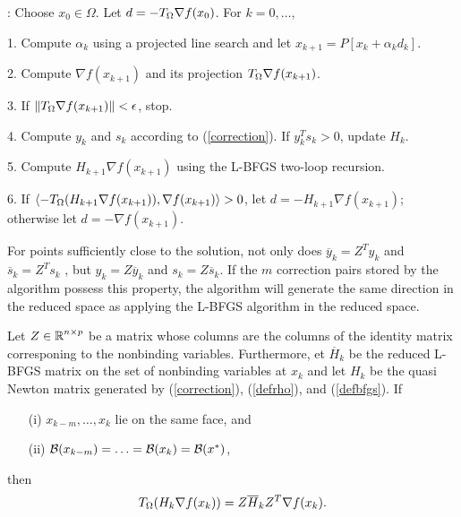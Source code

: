 \begin{Algorithm}
: 
Choose $ x_0 \in \Omega $. Let $d = - T_{\Omega} \nabla f(x_0)$.   
For $ k = 0, \ldots, $
\begin{list}{}
{
\setlength{\parsep}{0pt}
\setlength{\itemsep}{0pt}
\setlength{\topsep}{0pt}
}
\item[1.]
Compute $\alpha_k$ using a projected line search and let
$x_{k+1} = P [x_k + \alpha_k {d_k}]$.

\item[2.]
Compute $\nabla f(x_{k+1})$ and  its projection $T_{\Omega} \nabla f(x_{k+1})$.

\item[3.]
If $\| T_{\Omega} \nabla f(x_{k+1}) \| < \epsilon $, stop.

\item[4.] 
Compute $y_{k}$ and $s_{k}$ according to (\ref{correction}).  
If $y_{k}^Ts_{k} > 0$, update $H_{k}$.

\item[5.] 
Compute $H_{k+1} \nabla f(x_{k+1}) $ using the L-BFGS two-loop recursion.

\item[6.]
If $\langle -T_{\Omega} (H_{k+1} \nabla f(x_{k+1})),\nabla f(x_{k+1})\rangle > 0$,
let $d=- H_{k+1} \nabla f(x_{k+1})$;
otherwise let $d=-\nabla  f(x_{k+1})$.

\end{list}
\end{Algorithm}


For points sufficiently close to the solution, not only does 
$\overline{y}_k = Z^T y_k$  and $\overline{s}_k = Z^T s_k$ , but
$y_k = Z \overline{y}_k$ and $s_k = Z \overline{s}_k$.
If the $m$ correction pairs stored by the algorithm possess
this property, the algorithm will generate the same direction
in the reduced space as applying the L-BFGS algorithm in 
the reduced space.


\begin{theorem} \label{L1}
Let $Z \in \mbox{${\mathbb R}$}^{n \times p}$ be a matrix whose columns are
the columns of the identity matrix corresponing to the
nonbinding variables.  Furthermore, 
et $\overline{H}_k$ be the reduced L-BFGS matrix on the set
of nonbinding variables at $x_k$ and let $H_k$ be the
quasi Newton matrix generated by (\ref{correction}), (\ref{defrho}),
and (\ref{defbfgs}).
If
\begin{enumerate}
\item[(i)]   $x_{k-m}, \ldots, x_{k}$ lie on the same face, and
\item[(ii)]  $\mbox{$\cal B$} (x_{k-m}) = \ldots = \mbox{$\cal B$} (x_{k}) =\mbox{$\cal B$} (x^*) $, 
\end{enumerate}
then 
\begin{equation} \label{TT44}
T_{\Omega} ( H_k \nabla f(x_k) ) = Z \overline{H}_k Z^T \nabla f(x_k). 
\end{equation}
\end{theorem}

